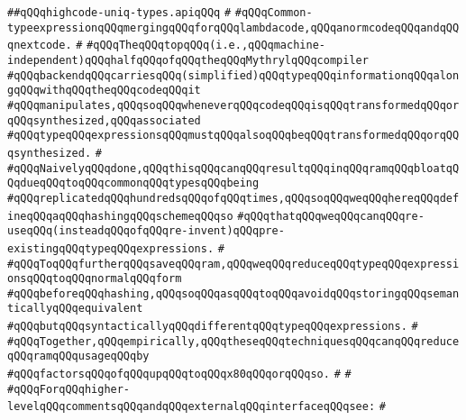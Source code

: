 \label{src/lib/compiler/back/top/highcode/highcode-uniq-types.api}
\verb|##qQQqhighcode-uniq-types.apiqQQq|\newline
\verb|#|\newline
\verb|#qQQqCommon-typeexpressionqQQqmergingqQQqforqQQqlambdacode,qQQqanormcodeqQQqandqQQqnextcode.|\newline
\verb|#|\newline
\verb|#qQQqTheqQQqtopqQQq(i.e.,qQQqmachine-independent)qQQqhalfqQQqofqQQqtheqQQqMythrylqQQqcompiler|\newline
\verb|#qQQqbackendqQQqcarriesqQQq(simplified)qQQqtypeqQQqinformationqQQqalongqQQqwithqQQqtheqQQqcodeqQQqit|\newline
\verb|#qQQqmanipulates,qQQqsoqQQqwheneverqQQqcodeqQQqisqQQqtransformedqQQqorqQQqsynthesized,qQQqassociated|\newline
\verb|#qQQqtypeqQQqexpressionsqQQqmustqQQqalsoqQQqbeqQQqtransformedqQQqorqQQqsynthesized.|\newline
\verb|#|\newline
\verb|#qQQqNaivelyqQQqdone,qQQqthisqQQqcanqQQqresultqQQqinqQQqramqQQqbloatqQQqdueqQQqtoqQQqcommonqQQqtypesqQQqbeing|\newline
\verb|#qQQqreplicatedqQQqhundredsqQQqofqQQqtimes,qQQqsoqQQqweqQQqhereqQQqdefineqQQqaqQQqhashingqQQqschemeqQQqso|\newline
\verb|#qQQqthatqQQqweqQQqcanqQQqre-useqQQq(insteadqQQqofqQQqre-invent)qQQqpre-existingqQQqtypeqQQqexpressions.|\newline
\verb|#|\newline
\verb|#qQQqToqQQqfurtherqQQqsaveqQQqram,qQQqweqQQqreduceqQQqtypeqQQqexpressionsqQQqtoqQQqnormalqQQqform|\newline
\verb|#qQQqbeforeqQQqhashing,qQQqsoqQQqasqQQqtoqQQqavoidqQQqstoringqQQqsemanticallyqQQqequivalent|\newline
\verb|#qQQqbutqQQqsyntacticallyqQQqdifferentqQQqtypeqQQqexpressions.|\newline
\verb|#|\newline
\verb|#qQQqTogether,qQQqempirically,qQQqtheseqQQqtechniquesqQQqcanqQQqreduceqQQqramqQQqusageqQQqby|\newline
\verb|#qQQqfactorsqQQqofqQQqupqQQqtoqQQqx80qQQqorqQQqso.|\newline
\verb|#|\newline
\verb|#|\newline
\verb|#qQQqForqQQqhigher-levelqQQqcommentsqQQqandqQQqexternalqQQqinterfaceqQQqsee:|\newline
\verb|#|\newline
